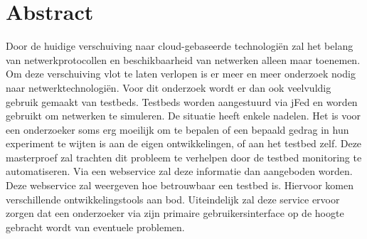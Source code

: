 \newpage
\chapter*{Abstract}
\npar
Door de huidige verschuiving naar cloud-gebaseerde technologi\"en zal het belang 
van netwerkprotocollen en beschikbaarheid van netwerken alleen maar toenemen.
Om deze verschuiving vlot te laten verlopen is er meer en meer onderzoek nodig naar netwerktechnologi\"en.
Voor dit onderzoek wordt er dan ook veelvuldig gebruik gemaakt van testbeds.
Testbeds worden aangestuurd via jFed en worden gebruikt om netwerken te simuleren.
De situatie heeft enkele nadelen. Het is voor een onderzoeker soms erg moeilijk om te bepalen of een bepaald gedrag in hun experiment te wijten is aan de eigen ontwikkelingen, of aan het testbed zelf.
\npar
Deze masterproef zal trachten dit probleem te verhelpen door de testbed monitoring te automatiseren. Via een webservice zal deze informatie dan aangeboden worden. Deze webservice zal weergeven hoe betrouwbaar een testbed is. Hiervoor komen verschillende ontwikkelingstools aan bod. Uiteindelijk zal deze service ervoor zorgen dat een onderzoeker via zijn primaire gebruikersinterface op de hoogte gebracht wordt van eventuele problemen.